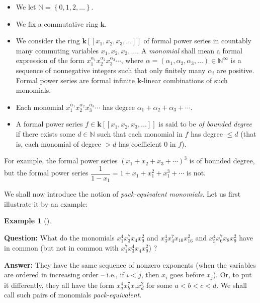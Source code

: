 \documentclass[numbers=enddot,12pt,final,onecolumn,notitlepage]{scrartcl}%
\theoremstyle{definition}
\newtheorem{exam}[theo]{Example}
\newenvironment{example}[1][]
{\begin{exam}[#1]\begin{leftbar}}
{\end{leftbar}\end{exam}}
\begin{document}
\begin{itemize}
\item We let $\mathbb{N}=\left\{  0,1,2,\ldots\right\}  $.

\item We fix a commutative ring $\mathbf{k}$.

\item We consider the ring $\mathbf{k}\left[  \left[  x_{1},x_{2},x_{3}%
,\ldots\right]  \right]  $ of formal power series in countably many commuting
variables $x_{1},x_{2},x_{3},\ldots$. A \emph{monomial} shall mean a formal
expression of the form $x_{1}^{\alpha_{1}}x_{2}^{\alpha_{2}}x_{3}^{\alpha_{3}%
}\cdots$, where $\alpha=\left(  \alpha_{1},\alpha_{2},\alpha_{3}%
,\ldots\right)  \in\mathbb{N}^{\infty}$ is a sequence of nonnegative integers
such that only finitely many $\alpha_{i}$ are positive. Formal power series
are formal infinite $\mathbf{k}$-linear combinations of such monomials.

\item Each monomial $x_{1}^{\alpha_{1}}x_{2}^{\alpha_{2}}x_{3}^{\alpha_{3}%
}\cdots$ has degree $\alpha_{1}+\alpha_{2}+\alpha_{3}+\cdots$.

\item A formal power series $f\in\mathbf{k}\left[  \left[  x_{1},x_{2}%
,x_{3},\ldots\right]  \right]  $ is said to be \emph{of bounded degree} if
there exists some $d\in\mathbb{N}$ such that each monomial in $f$ has degree
$\leq d$ (that is, each monomial of degree $>d$ has coefficient $0$ in $f$).
\end{itemize}

For example, the formal power series $\left(  x_{1}+x_{2}+x_{3}+\cdots\right)
^{3}$ is of bounded degree, but the formal power series $\dfrac{1}{1-x_{1}%
}=1+x_{1}+x_{1}^{2}+x_{1}^{3}+\cdots$ is not.

We shall now introduce the notion of \textit{pack-equivalent monomials}. Let
us first illustrate it by an example:

\begin{example}
\textbf{Question:} What do the monomials $x_{1}^{4}x_{3}^{7}x_{4}x_{9}^{2}$
and $x_{3}^{4}x_{4}^{7}x_{10}x_{16}^{2}$ and $x_{5}^{4}x_{6}^{7}x_{8}x_{9}%
^{2}$ have in common (but not in common with $x_{1}^{7}x_{3}^{4}x_{4}x_{9}%
^{2}$) ?

\textbf{Answer:} They have the same sequence of nonzero exponents (when the
variables are ordered in increasing order -- i.e., if $i<j$, then $x_{i}$ goes
before $x_{j}$). Or, to put it differently, they all have the form $x_{a}%
^{4}x_{b}^{7}x_{c}x_{d}^{2}$ for some $a<b<c<d$. We shall call such pairs of
monomials \textit{pack-equivalent}.
\end{example}
\end{document}
